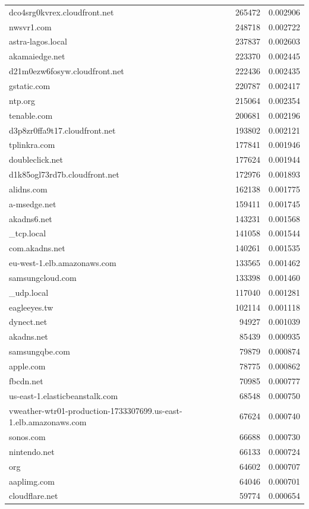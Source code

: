\begin{tabular}{lrr}
dco4srg0kvrex.cloudfront.net & 265472 & 0.002906 \\
nwsvr1.com & 248718 & 0.002722 \\
astra-lagos.local & 237837 & 0.002603 \\
akamaiedge.net & 223370 & 0.002445 \\
d21m0ezw6fosyw.cloudfront.net & 222436 & 0.002435 \\
gstatic.com & 220787 & 0.002417 \\
ntp.org & 215064 & 0.002354 \\
tenable.com & 200681 & 0.002196 \\
d3p8zr0ffa9t17.cloudfront.net & 193802 & 0.002121 \\
tplinkra.com & 177841 & 0.001946 \\
doubleclick.net & 177624 & 0.001944 \\
d1k85ogl73rd7b.cloudfront.net & 172976 & 0.001893 \\
alidns.com & 162138 & 0.001775 \\
a-msedge.net & 159411 & 0.001745 \\
akadns6.net & 143231 & 0.001568 \\
_tcp.local & 141058 & 0.001544 \\
com.akadns.net & 140261 & 0.001535 \\
eu-west-1.elb.amazonaws.com & 133565 & 0.001462 \\
samsungcloud.com & 133398 & 0.001460 \\
_udp.local & 117040 & 0.001281 \\
eagleeyes.tw & 102114 & 0.001118 \\
dynect.net & 94927 & 0.001039 \\
akadns.net & 85439 & 0.000935 \\
samsungqbe.com & 79879 & 0.000874 \\
apple.com & 78775 & 0.000862 \\
fbcdn.net & 70985 & 0.000777 \\
us-east-1.elasticbeanstalk.com & 68548 & 0.000750 \\
vweather-wtr01-production-1733307699.us-east-1.elb.amazonaws.com & 67624 & 0.000740 \\
sonos.com & 66688 & 0.000730 \\
nintendo.net & 66133 & 0.000724 \\
org & 64602 & 0.000707 \\
aaplimg.com & 64046 & 0.000701 \\
cloudflare.net & 59774 & 0.000654 \\

\end{tabular}
